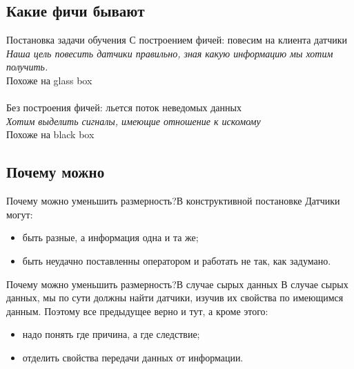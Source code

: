 \documentclass[14pt, fleqn, xcolor={dvipsnames, table}]{beamer}
\begin{document}
\subsection{Какие фичи бывают}
\begin{frame}{Постановка задачи обучения}{}
{\color{blue}С построением фичей}: повесим на клиента датчики \\
\textit{Наша цель повесить датчики правильно, зная какую информацию мы хотим получить.}\\
Похоже на glass box\\
~\\
{\color{blue}Без построения фичей}: льется поток неведомых данных \\
\textit{Хотим выделить сигналы, имеющие отношение к искомому} \\
Похоже на black box
\end{frame}

\subsection{Почему можно} %
\begin{frame}{Почему можно уменьшить размерность?}{В конструктивной постановке}
Датчики могут:
\begin{itemize}
  \item быть разные, а информация одна и та же;
  \item быть неудачно поставленны оператором и работать не так, как задумано.
\end{itemize}
\end{frame}

\begin{frame}{Почему можно уменьшить размерность?}{В случае сырых данных}
В случае сырых данных, мы по сути должны найти датчики, изучив их свойства по имеющимся данным. Поэтому все предыдущее верно и тут, а кроме этого:
\begin{itemize}
  \item надо понять где причина, а где следствие;
  \item отделить свойства передачи данных от информации.
\end{itemize}
\end{frame}
\end{document}
